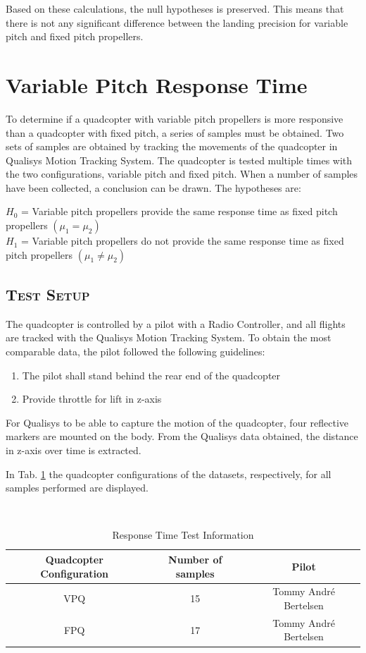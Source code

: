 Based on these calculations, the null hypotheses is preserved. This means that there is not any significant difference between the landing precision for variable pitch and fixed pitch propellers. 
\newpage




\section{Variable Pitch Response Time}
\label{sec:resptime}
To determine if a quadcopter with variable pitch propellers is more responsive than a quadcopter with fixed pitch, a series of samples must be obtained. Two sets of samples are obtained by tracking the movements of the quadcopter in Qualisys Motion Tracking System. The quadcopter is tested multiple times with the two configurations, variable pitch and fixed pitch. When a number of samples have been collected, a conclusion can be drawn. The hypotheses are:\bigskip

$ H_0$ = Variable pitch propellers provide the same response time as fixed pitch propellers $(\mu_1 = \mu_2 )$\\
$ H_1$ = Variable pitch propellers do not provide the same response time as fixed pitch propellers $(\mu_1 \neq \mu_2 )$\bigskip

\subsection{\textsc{\medium Test Setup}}
The quadcopter is controlled by a pilot with a Radio Controller, and all flights are tracked with the Qualisys Motion Tracking System. To obtain the most comparable data, the pilot followed the following guidelines:
\begin{enumerate}
  \item The pilot shall stand behind the rear end of the quadcopter
  \item Provide throttle for lift in z-axis
\end{enumerate}\bigskip

For Qualisys to be able to capture the motion of the quadcopter, four reflective markers are mounted on the body. From the Qualisys data obtained, the distance in z-axis over time is extracted. 
\bigskip

In Tab. \ref{tab:datta1} the quadcopter configurations of the datasets, respectively, for all samples performed are displayed. 
\begin{table}[H]
\caption{Response Time Test Information}\\
\label{tab:datta1}
\centering
\begin{tabular}{| c | c | c | } 
  \hline
  Quadcopter Configuration & Number of samples & Pilot \\
  \hline
  VPQ &  15 & Tommy André Bertelsen  \\
  FPQ &  17 & Tommy André Bertelsen  \\
  \hline
\end{tabular}
\end{table}

